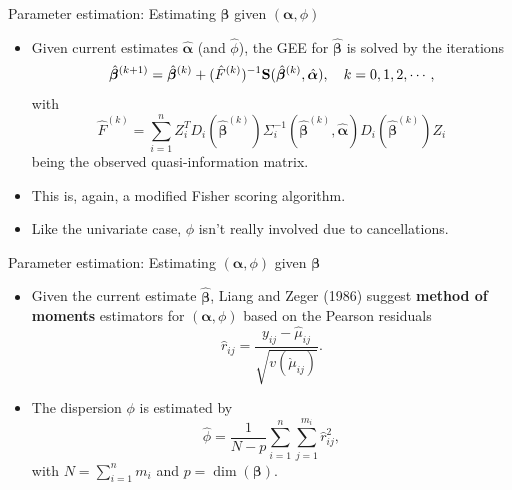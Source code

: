 \documentclass{beamer}
\newcommand{\boldbeta}{{\boldsymbol \beta}}
\newcommand{\boldalpha}{{\boldsymbol \alpha}}
\newenvironment{wideitemize}%
  {\begin{itemize}%
    \setlength{\parskip}{1em}}%
  {\end{itemize}}
\begin{document}
\begin{frame}{Parameter estimation: Estimating $\boldbeta$ given $(\boldalpha, \phi)$}
\begin{wideitemize}




\item 
Given current estimates $\hat{\boldalpha}$ (and $\hat{\phi}$), the GEE  for
$\hat{\boldbeta}$ is solved by the iterations
\[
\hat{\boldbeta}^{(k+1)}=\hat{\boldbeta}^{(k)}+
(\hat{F}^{(k)})^{-1}{\bf S}( \hat{\boldbeta}^{(k)},
\hat{\boldalpha}), \quad k=0,1,2, \cdots, 
\]
with 
\[
\hat{F}^{(k)}=\sum_{i=1}^n Z_i^TD_i(\hat{\boldbeta}^{(k)}) \Sigma_i^{-1}(
\hat{\boldbeta}^{(k)}, \hat{\boldalpha})
D_i(\hat{\boldbeta}^{(k)})Z_i
\]
being the observed quasi-information matrix.

\item This is, again, a modified Fisher scoring algorithm. 

\item Like the univariate case, $\phi$ isn't really involved due to cancellations.

\end{wideitemize}
\end{frame}


%



\begin{frame}{Parameter estimation: Estimating $(\boldalpha, \phi)$ given $\boldbeta$}

\begin{itemize}
\item 
Given the current estimate $\hat{\boldbeta}$, Liang and Zeger (1986) suggest   {\bf method of moments} estimators for $(\boldalpha, \phi)$ based on the Pearson residuals
 \[ \hat{r}_{ij}=\frac{y_{ij}-\hat{\mu}_{ij}}{\sqrt{v(\hat{\mu}_{ij})}}.\]
\item
The dispersion $\phi$ is estimated  by
\[
\hat{\phi}=\frac{1}{N-p}\sum_{i=1}^n\sum_{j=1}^{m_i}\hat{r}_{ij}^2,
\] 
with $N=\sum_{i=1}^n m_i$ and $p=\dim (\boldbeta)$.

\end{itemize}

%
\end{frame}
%
%
%
\end{document}
